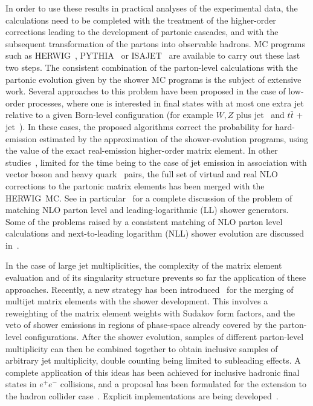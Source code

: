 \documentclass[paper]{JHEP3}
\def\herwig{{\small HERWIG}}
\def\isajet{{\small ISAJET}}
\def\pythia{{\small PYTHIA}}
\begin{document}
In order to use these results in practical analyses of the
experimental data, the calculations need to be completed with the
treatment of the higher-order corrections leading to the development
of partonic cascades, and with the subsequent transformation of the
partons into observable hadrons.  MC programs such as
\herwig~\cite{Marchesini:1988cf}, \pythia~\cite{Sjostrand:1994yb} or
\isajet~\cite{Paige:1998xm} are available to carry out these last two
steps. The consistent combination of the parton-level calculations
with the partonic evolution given by the shower MC programs is the
subject of extensive work.  Several approaches to this problem have
been proposed in the case of low-order processes, where one is
interested in final states with at most one extra jet relative to a
given Born-level configuration (for example $W,Z$ plus
jet~\cite{Seymour:1995df} and $t\bar{t}$ +
jet~\cite{Corcella:1998rs}).  In these cases, the proposed algorithms
correct the probability for hard-emission estimated by the
approximation of the shower-evolution programs, using the value of the
exact real-emission higher-order matrix element. In other
studies~\cite{Dobbs:2001gb,Grace:2003npb,Frixione:2002ik}, limited 
for the time
being to the case of jet emission in association with vector boson and
heavy quark~\cite{Frixione:2003ei} pairs, the full set of virtual and
real NLO corrections to the partonic matrix elements has been merged
with the \herwig\ MC. See in particular~\cite{Frixione:2002ik} for a
complete discussion of the problem of matching NLO parton level and
leading-logarithmic (LL) shower generators.  Some of the problems
raised by a consistent matching of NLO parton level calculations and
next-to-leading logarithm (NLL) shower evolution are discussed
in~\cite{Collins:2000qd}.

In the case of large jet multiplicities, the complexity of the matrix
element evaluation and of its singularity structure prevents so far
the application of these approaches. 
Recently, a new strategy has been introduced~\cite{Catani:2001cc}
 for the merging of
multijet matrix elements with the shower development. This involves a
reweighting of the matrix element weights with Sudakov form factors,
and the veto of shower emissions in regions of phase-space already
covered by the parton-level configurations. After the shower
evolution, samples of different
parton-level multiplicity can then be combined together to obtain
inclusive samples of arbitrary jet multiplicity, double counting being
limited to subleading effects. A complete application of this ideas
has been achieved for inclusive hadronic final states in $e^+e^-$
collisions, and a proposal has been formulated for the extension to
the hadron collider case~\cite{Krauss:2002up}. Explicit
implementations are being developed~\cite{kraussetal}.
 
\end{document}
